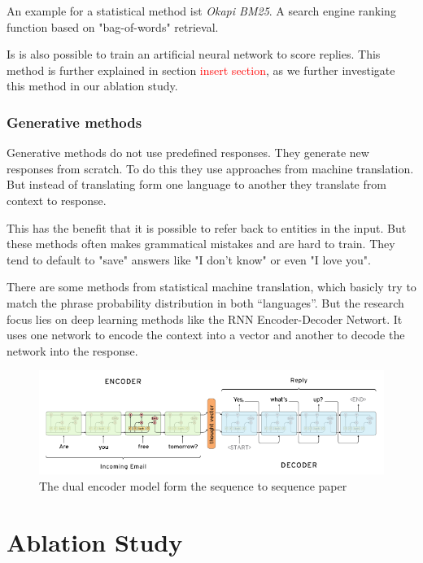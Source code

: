 \documentclass[conference]{IEEEtran}
\newcommand\note[1]{\textcolor{red}{#1}}
\begin{document}
An example for a statistical method ist \emph{Okapi BM25}\cite{manning2008introduction}. A search engine ranking function based on "bag-of-words" retrieval.

Is is also possible to train an artificial neural network to score replies\cite{yan2016shall,lowe2015ubuntu}. This method is further explained in section \note{insert section}, as we further investigate this method in our ablation study.

\subsubsection{Generative methods}
Generative methods do not use predefined responses. They generate new responses from scratch. To do this they use approaches from machine translation. But instead of translating form one language to another they translate from context to response.

This has the benefit that it is possible to refer back to entities in the input. But these methods often makes grammatical mistakes and are hard to train. They tend to default to "save" answers like "I don't know" or even "I love you".\

There are some methods from statistical machine translation, which basicly try to match the phrase probability distribution in both “languages”. But the research focus lies on deep learning methods like the RNN Encoder-Decoder Networt\cite{sutskever2014sequence}. It uses one network to encode the context into a vector and another to decode the network into the response.

\begin{figure}[H]
\centering
   \includegraphics[width=\linewidth]{sequence_to_sequence.png}
  \caption{The dual encoder model form the sequence to sequence paper\cite{sutskever2014sequence}}
  \label{fig:dstChallengeProbabilistic}
\end{figure}

\section{Ablation Study}
\end{document}
